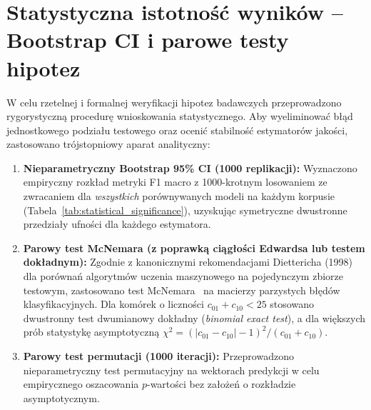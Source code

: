 \documentclass[12pt,a4paper,twoside]{report}
\begin{document}
\section{Statystyczna istotność wyników -- Bootstrap CI i parowe testy hipotez}\label{sec:stats}
W celu rzetelnej i formalnej weryfikacji hipotez badawczych przeprowadzono rygorystyczną procedurę wnioskowania statystycznego. Aby wyeliminować błąd jednostkowego podziału testowego oraz ocenić stabilność estymatorów jakości, zastosowano trójstopniowy aparat analityczny:
\begin{enumerate}[leftmargin=*]
  \item \textbf{Nieparametryczny Bootstrap 95\% CI (1000 replikacji):} Wyznaczono empiryczny rozkład metryki F1 macro z 1000-krotnym losowaniem ze zwracaniem dla \emph{wszystkich} porównywanych modeli na każdym korpusie (Tabela~\ref{tab:statistical_significance}), uzyskując symetryczne dwustronne przedziały ufności dla każdego estymatora.
  \item \textbf{Parowy test McNemara (z poprawką ciągłości Edwardsa lub testem dokładnym):} Zgodnie z kanonicznymi rekomendacjami Diettericha (1998)~\cite{dietterich1998} dla porównań algorytmów uczenia maszynowego na pojedynczym zbiorze testowym, zastosowano test McNemara~\cite{mcnemar1947} na macierzy parzystych błędów klasyfikacyjnych. Dla komórek o liczności $c_{01} + c_{10} < 25$ stosowano dwustronny test dwumianowy dokładny (\emph{binomial exact test}), a dla większych prób statystykę asymptotyczną $\chi^2 = (|c_{01} - c_{10}| - 1)^2 / (c_{01} + c_{10})$.
  \item \textbf{Parowy test permutacji (1000 iteracji):} Przeprowadzono nieparametryczny test permutacyjny na wektorach predykcji w celu empirycznego oszacowania $p$-wartości bez założeń o rozkładzie asymptotycznym.
\end{enumerate}
\end{document}
